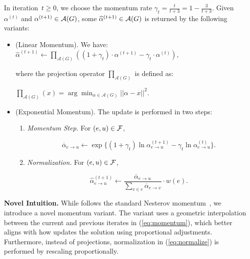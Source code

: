 \begin{definition}
\label{defn:momentum}
In iteration~$t \geq 0$, we choose the momentum rate $\gamma_t = \frac{t}{t+3} = 1 - \frac{3}{t+3}$.
Given $\alpha^{(t)}$ and $\alpha^{(t+1)} \in \mathcal {A}(G)$,
some $\widehat{\alpha}^{(t+1)} \in \mathcal {A}(G)$ is returned 
by the following variants:

\begin{itemize}

\item \prlin (Linear Momentum).  We have:
$\widehat{\alpha}^{(t+1)} \gets
\prod_{\mathcal{A}(G)} \left( (1 + \gamma_t) \cdot \alpha^{(t+1)} - \gamma_t \cdot \alpha^{(t)}
\right ),$

where the projection operator $\prod_{\mathcal{A}(G)}$ is defined as:


$\prod_{\mathcal{A}(G)}(x) = \arg \min_{\alpha \in \mathcal{A}(G)} || \alpha - x ||^2$.

\vspace{5pt}


\item \prexp (Exponential Momentum). The update is performed in two steps:

\begin{enumerate}

\item \emph{Momentum Step.} For $(e, u) \in \mathcal {F}$,

\begin{equation} \label{eq:momentum}
\overline{\alpha}_{e \to u} \gets \exp\{
(1 + \gamma_t)  \ln  \alpha^{(t+1)}_{e \to u} - \gamma_t  \ln \alpha^{(t)}_{e \to u}\}.
\end{equation}

\item \emph{Normalization.} For $(e,u) \in \mathcal {F}$,

\begin{equation} \label{eq:normalize}
\widehat{\alpha}^{(t+1)}_{e \to u} \gets  \frac{\overline{\alpha}_{e \to u}}{\sum_{v \in e}  \overline{\alpha}_{e \to v}} \cdot w(e).
\end{equation}

\end{enumerate}

\end{itemize}

\end{definition}

\noindent \textbf{Novel Intuition.} 
While \prlin follows the standard Nesterov momentum~\cite{Nesterov1983AMF}, we introduce a novel momentum variant. The \prexp variant uses a geometric interpolation between the current and previous iterates in (\ref{eq:momentum}), which better aligns with how \pr updates the solution using proportional adjustments. Furthermore, instead of projections, normalization in (\ref{eq:normalize}) is performed by rescaling proportionally.


